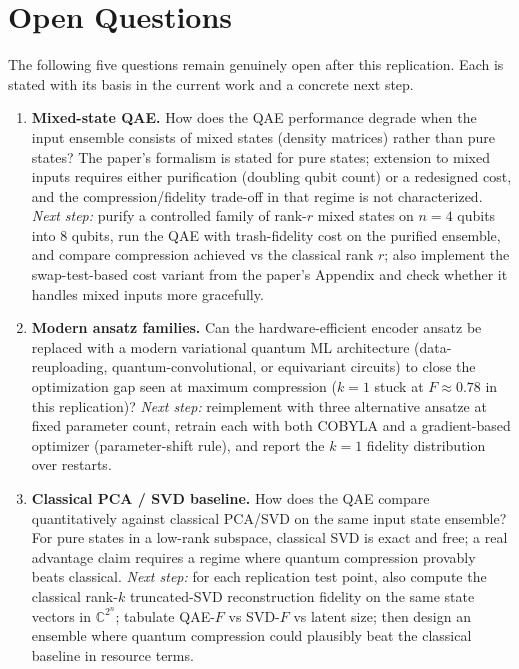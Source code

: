 \section{Open Questions}

The following five questions remain genuinely open after this replication.
Each is stated with its basis in the current work and a concrete next step.

\begin{enumerate}

\item \textbf{Mixed-state QAE.}
How does the QAE performance degrade when the input ensemble consists of mixed
states (density matrices) rather than pure states? The paper's formalism is
stated for pure states; extension to mixed inputs requires either purification
(doubling qubit count) or a redesigned cost, and the compression/fidelity
trade-off in that regime is not characterized.
\emph{Next step:} purify a controlled family of rank-$r$ mixed states on $n=4$
qubits into 8 qubits, run the QAE with trash-fidelity cost on the purified
ensemble, and compare compression achieved vs the classical rank $r$; also
implement the swap-test-based cost variant from the paper's Appendix and check
whether it handles mixed inputs more gracefully.

\item \textbf{Modern ansatz families.}
Can the hardware-efficient encoder ansatz be replaced with a modern variational
quantum ML architecture (data-reuploading, quantum-convolutional, or
equivariant circuits) to close the optimization gap seen at maximum compression
($k=1$ stuck at $F \approx 0.78$ in this replication)?
\emph{Next step:} reimplement with three alternative ansatze at fixed parameter
count, retrain each with both COBYLA and a gradient-based optimizer
(parameter-shift rule), and report the $k=1$ fidelity distribution over
restarts.

\item \textbf{Classical PCA / SVD baseline.}
How does the QAE compare quantitatively against classical PCA/SVD on the same
input state ensemble? For pure states in a low-rank subspace, classical SVD is
exact and free; a real advantage claim requires a regime where quantum
compression provably beats classical.
\emph{Next step:} for each replication test point, also compute the classical
rank-$k$ truncated-SVD reconstruction fidelity on the same state vectors in
$\mathbb{C}^{2^n}$; tabulate QAE-$F$ vs SVD-$F$ vs latent size; then design an
ensemble where quantum compression could plausibly beat the classical baseline
in resource terms.


\end{enumerate}
